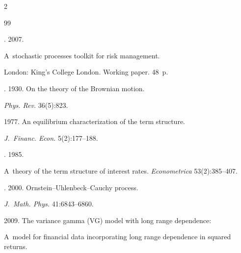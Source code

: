  \begin{multicols}{2}





\renewcommand{\bibname}{\protect\rmfamily References}







{\small\frenchspacing


 {%




 \begin{thebibliography}{99}







. 2007. 


{A~stochastic processes toolkit for risk management}. 


London: King's College London.  Working paper. 48~p.




. 1930. On the theory of the Brownian motion. 


\textit{Phys. Rev.} 36(5):823.




 1977. An equilibrium characterization of the term structure. 


\textit{J.~Financ. Econ.} 5(2):177--188.




. 1985. 


A~theory of the term structure of interest rates. \textit{Econometrica} 53(2):385--407.




. 2000. Ornstein--Uhlenbeck--Cauchy process. 


\textit{J.~Math. Phys.} 41:6843--6860.




 2009. The variance gamma (VG) model with long range dependence: 


A~model for financial data incorporating long range dependence in squared returns.



\end{thebibliography}}}
\end{multicols}
